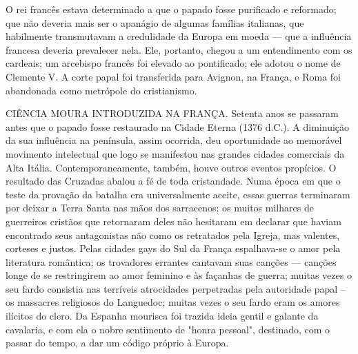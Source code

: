 \documentclass[11pt,a5paper,twoside,openany]{book}
\begin{document}
O rei francês estava determinado a que o papado fosse purificado e reformado; que não deveria mais ser o apanágio de algumas famílias italianas, que habilmente transmutavam a credulidade da Europa em moeda — que a influência francesa deveria prevalecer nela. Ele, portanto, chegou a um entendimento com os cardeais; um arcebispo francês foi elevado ao pontificado; ele adotou o nome de Clemente V. A corte papal foi transferida para Avignon, na França, e Roma foi abandonada como metrópole do cristianismo.

CIÊNCIA MOURA INTRODUZIDA NA FRANÇA. Setenta anos se passaram antes que o papado fosse restaurado na Cidade Eterna (1376 d.C.). A diminuição da sua influência na península, assim ocorrida, deu oportunidade ao memorável movimento intelectual que logo se manifestou nas grandes cidades comerciais da Alta Itália. Contemporaneamente, também, houve outros eventos propícios. O resultado das Cruzadas abalou a fé de toda cristandade. Numa época em que o teste da provação da batalha era universalmente aceite, essas guerras terminaram por deixar a Terra Santa nas mãos dos sarracenos; os muitos milhares de guerreiros cristãos que retornaram deles não hesitaram em declarar que haviam encontrado seus antagonistas não como os retratados pela Igreja, mas valentes, corteses e justos. Pelas cidades gays do Sul da França espalhava-se o amor pela literatura romântica; os trovadores errantes cantavam suas canções — canções longe de se restringirem ao amor feminino e às façanhas de guerra; muitas vezes o seu fardo consistia nas terríveis atrocidades perpetradas pela autoridade papal – os massacres religiosos do Languedoc; muitas vezes o seu fardo eram os amores ilícitos do clero. Da Espanha mourisca foi trazida ideia gentil e galante da cavalaria, e com ela o nobre sentimento de "honra pessoal", destinado, com o passar do tempo, a dar um código próprio à Europa.
\end{document}
